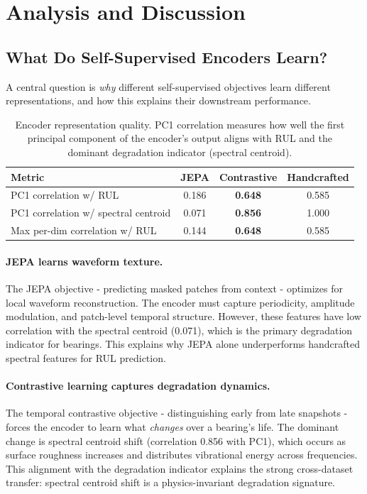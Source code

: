 \section{Analysis and Discussion}
\label{sec:analysis}

\subsection{What Do Self-Supervised Encoders Learn?}
\label{sec:encoder_analysis}

A central question is \emph{why} different self-supervised objectives learn different representations, and how this explains their downstream performance.

\begin{table}[t]
\centering
\caption{Encoder representation quality. PC1 correlation measures how well the first principal component of the encoder's output aligns with RUL and the dominant degradation indicator (spectral centroid).}
\label{tab:encoder}
\small
\begin{tabular}{@{}lccc@{}}
\toprule
Metric & JEPA & Contrastive & Handcrafted \\
\midrule
PC1 correlation w/ RUL & 0.186 & \textbf{0.648} & 0.585 \\
PC1 correlation w/ spectral centroid & 0.071 & \textbf{0.856} & 1.000 \\
Max per-dim correlation w/ RUL & 0.144 & \textbf{0.648} & 0.585 \\
\bottomrule
\end{tabular}
\end{table}

\paragraph{JEPA learns waveform texture.} The JEPA objective - predicting masked patches from context - optimizes for local waveform reconstruction. The encoder must capture periodicity, amplitude modulation, and patch-level temporal structure. However, these features have low correlation with the spectral centroid (0.071), which is the primary degradation indicator for bearings. This explains why JEPA alone underperforms handcrafted spectral features for RUL prediction.

\paragraph{Contrastive learning captures degradation dynamics.} The temporal contrastive objective - distinguishing early from late snapshots - forces the encoder to learn what \emph{changes} over a bearing's life. The dominant change is spectral centroid shift (correlation 0.856 with PC1), which occurs as surface roughness increases and distributes vibrational energy across frequencies. This alignment with the degradation indicator explains the strong cross-dataset transfer: spectral centroid shift is a physics-invariant degradation signature.

